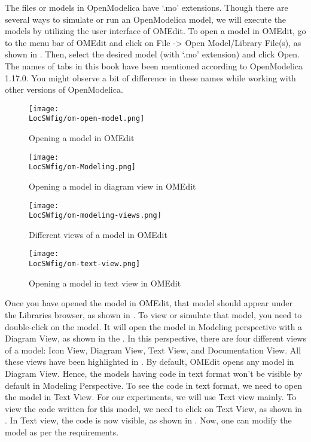 The files or models in OpenModelica have `.mo' extensions. Though there are several ways to simulate or run 
an OpenModelica model, we will execute the models by utilizing the user interface of OMEdit. To open 
a model in OMEdit, go to the menu bar of OMEdit and click on File -> Open Model/Library File(s), as shown 
in . Then, select the desired model (with `.mo' extension) and click Open. The names of tabs in
this book have been mentioned according to OpenModelica 1.17.0. You might observe a bit
of difference in these names while working with other versions of OpenModelica. 

\begin{figure}
      \centering
      \texttt{[image: \\LocSWfig/om-open-model.png]}
      \caption{Opening a model in OMEdit}
      \label{om-model-open}
\end{figure}

\begin{figure}
      \centering
      \texttt{[image: \\LocSWfig/om-Modeling.png]}
      \caption{Opening a model in diagram view in OMEdit}
      \label{om-modeling}
\end{figure}


\begin{figure}
      \centering
      \texttt{[image: \\LocSWfig/om-modeling-views.png]}
      \caption{Different views of a model in OMEdit}
      \label{om-views}
\end{figure}


\begin{figure}
      \centering
      \texttt{[image: \\LocSWfig/om-text-view.png]}
      \caption{Opening a model in text view in OMEdit}
      \label{om-text-view}
\end{figure}

Once you have opened the model in OMEdit, that model should appear under the Libraries
browser, as shown in . To view or simulate that model, you need to 
double-click on the model. It will open the model in Modeling perspective with a Diagram View, as shown 
in the . In this perspective, there are four different views of 
a model: Icon View, Diagram View, Text View, and Documentation View. All these views have been highlighted in . 
By default, OMEdit opens any model in Diagram View. Hence, the models 
having code in text format won't be visible by default in Modeling 
Perspective. To see the code in text format, we need to open the model in 
Text View. For our experiments, we will use Text view mainly. To view the code written for this model, 
we need to click on Text View, as shown in . In Text view, the code is now visible, as 
shown in . Now, one can modify the model as per the requirements. 

